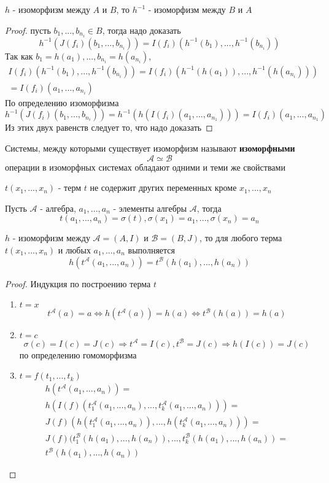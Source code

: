 \documentclass[../main/document.tex]{subfiles}
\begin{document}
\begin{thm}\label{isomorphism-inverse}
$h$ - изоморфизм между $A$ и $B$, то $h^{-1}$ - изоморфизм между $B$ и $A$
\begin{proof} пусть $b_1,...,b_{n_i}\in B$, тогда надо доказать
$$h^{-1}(J(f_i)(b_1,...,b_{n_i}))=I(f_i)(h^{-1}(b_1),...,h^{-1}(b_{n_i}))$$
Так как $b_1=h(a_1),...,b_{n_i}=h(a_{n_i})$,
\begin{multline*}
I(f_i)(h^{-1}(b_1),...,h^{-1}(b_{n_i}))=I(f_i)(h^{-1}(h(a_1)),...,h^{-1}(h(a_{n_i})))\\
=I(f_i)(a_1,...,a_{n_i})
\end{multline*}
$$$$
По определению изоморфизма
$$h^{-1}(J(f_i)(b_1,...,b_{n_i}))=h^{-1}(h(I(f_i)(a_1,...,a_{n_1})))=I(f_i)(a_1,...,a_{n_1})$$
Из этих двух равенств следует то, что надо доказать
\end{proof}
\end{thm}

\begin{dfn}
Системы, между которыми существует изоморфизм называют \textbf{изоморфными}
$$\mathcal{A}\simeq\mathcal{B}$$
операции в изоморфных системах обладают одними и теми же свойствами
\end{dfn}

\begin{dfn}
$t(x_1,...,x_n)$ - терм $t$ не содержит других переменных кроме $x_1,...,x_n$
\end{dfn}
\begin{dfn}
Пусть $\mathcal{A}$ - алгебра, $a_1,...,a_n$ - элементы алгебры $\mathcal{A}$, тогда
$$t(a_1,...,a_n)=\sigma(t), \sigma(x_1)=a_1,...,\sigma(x_n)=a_n$$
\end{dfn}
\begin{thm}
$h$ - изоморфизм между $\mathcal{A}=(A,I)$ и $\mathcal{B}=(B,J)$, то для любого терма $t(x_1,...,x_n)$ и любых $a_1,...,a_n$ выполняется
$$h(t^{\mathcal{A}}(a_1,...,a_n))=t^{\mathcal{B}}(h(a_1),...,h(a_n))$$
\begin{proof}
Индукция по построению терма $t$
\begin{enumerate}
\item $t=x$
$$t^{\mathcal{A}}(a)=a\Leftrightarrow h(t^{\mathcal{A}}(a))=h(a)\Leftrightarrow t^{\mathcal{B}}(h(a))=h(a)$$
\item $t=c$
$$\sigma(c)=I(c)=J(c)\Rightarrow t^{\mathcal{A}}=I(c), t^{\mathcal{B}}=J(c)\Rightarrow h(I(c))=J(c)$$
по определению гомоморфизма
\item $t=f(t_1,...,t_k)$
\begin{multline*}
h(t^{\mathcal{A}}(a_1,...,a_n))=\\
h(I(f)(t^{\mathcal{A}}_{1}(a_1,...,a_n),...,t^{\mathcal{A}}_{k}(a_1,...,a_n)))=\\
J(f)(h(t^{\mathcal{A}}_{1}(a_1,...,a_n)),...,h(t^{\mathcal{A}}_{k}(a_1,...,a_n)))=\\
J(f)(t^{\mathcal{B}}_{1}(h(a_1),...,h(a_n)),...,t^{\mathcal{B}}_{k}(h(a_1),...,h(a_n))=\\
t^{\mathcal{B}}(h(a_1),...,h(a_n))
\end{multline*}
\end{enumerate}
\end{proof}
\end{thm}
\end{document}
